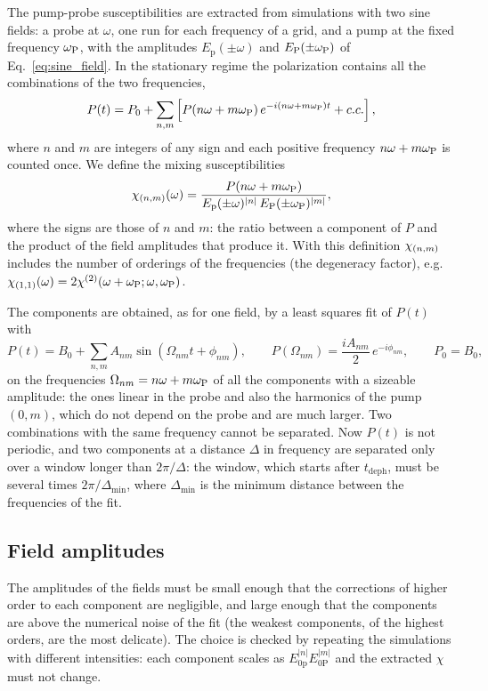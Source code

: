 \documentclass[10pt,a4paper]{paper}
\begin{document}
The pump-probe susceptibilities are extracted from simulations with two sine fields: a probe at $\omega$, one run for
each frequency of a grid, and a pump at the fixed frequency $\omega_{\mathrm{P}}$, with the amplitudes $E_{\mathrm{p}}(\pm\omega)$ and
$E_{\mathrm{P}}(\pm\omega_{\mathrm{P}})$ of Eq.~\eqref{eq:sine_field}. In the stationary regime the polarization contains all the combinations of
the two frequencies,
\begin{equation}
P(t) = P_0 + \sum_{n,m}\left[P(n\omega+m\omega_{\mathrm{P}})\,e^{-i(n\omega+m\omega_{\mathrm{P}})t} + c.c.\right] ,
\label{eq:P_mixing}
\end{equation}
where $n$ and $m$ are integers of any sign and each positive frequency $n\omega+m\omega_{\mathrm{P}}$ is counted once. We define the
mixing susceptibilities
\begin{equation}
\chi_{(n,m)}(\omega) = \frac{P(n\omega+m\omega_{\mathrm{P}})}{E_{\mathrm{p}}(\pm\omega)^{|n|}\,E_{\mathrm{P}}(\pm\omega_{\mathrm{P}})^{|m|}} ,
\label{eq:chi_nm}
\end{equation}
where the signs are those of $n$ and $m$: the ratio between a component of $P$ and the product of the field
amplitudes that produce it. With this definition $\chi_{(n,m)}$ includes the number of orderings of the frequencies (the
degeneracy factor), e.g.\ $\chi_{(1,1)}(\omega) = 2\chi^{(2)}(\omega+\omega_{\mathrm{P}};\omega,\omega_{\mathrm{P}})$.

The components are obtained, as for one field, by a least squares fit of $P(t)$ with
\begin{equation}
P(t) = B_0 + \sum_{n,m}A_{nm}\sin(\Omega_{nm}t+\phi_{nm}) , \qquad
P(\Omega_{nm}) = \frac{iA_{nm}}{2}\,e^{-i\phi_{nm}} , \qquad P_0 = B_0 ,
\label{eq:fit_mixing}
\end{equation}
on the frequencies $\Omega_{nm} = n\omega+m\omega_{\mathrm{P}}$ of all the components with a sizeable amplitude: the ones linear in the
probe and also the harmonics of the pump $(0,m)$, which do not depend on the probe and are much larger. Two
combinations with the same frequency cannot be separated. Now $P(t)$ is not periodic, and two components at a distance
$\Delta$ in frequency are separated only over a window longer than $2\pi/\Delta$: the window, which starts after
$t_{\mathrm{deph}}$, must be several times $2\pi/\Delta_{\min}$, where $\Delta_{\min}$ is the minimum distance between
the frequencies of the fit.

\subsection{Field amplitudes}
\label{sec:extraction_amplitudes}

The amplitudes of the fields must be small enough that the corrections of higher order to each component are
negligible, and large enough that the components are above the numerical noise of the fit (the weakest components, of the highest orders, are the most
delicate). The choice is checked by repeating the simulations with
different intensities: each component scales as $E_{0\mathrm{p}}^{|n|}E_{0\mathrm{P}}^{|m|}$ and the extracted $\chi$
must not change.
\end{document}
